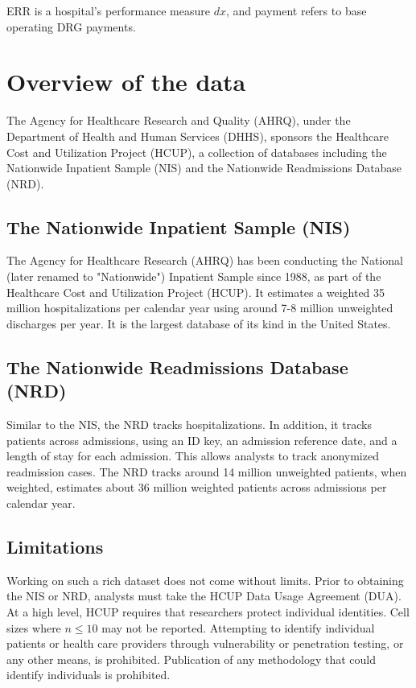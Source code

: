 \documentclass[12pt]{ociamthesis}\usepackage[]{graphicx}\usepackage[]{color}
\begin{document}
ERR is a hospital's performance measure $dx$, and payment refers to base operating DRG payments. \cite{HRRPPaymentAdjustment, Lessa2015}


\section{Overview of the data}

The Agency for Healthcare Research and Quality (AHRQ), under the Department of Health and Human Services (DHHS), sponsors the
Healthcare Cost and Utilization Project (HCUP), a collection of databases including the Nationwide Inpatient Sample (NIS) and
the Nationwide Readmissions Database (NRD). \cite{HCUPOverview}

\subsection{The Nationwide Inpatient Sample (NIS)}

The Agency for Healthcare Research (AHRQ) has been conducting the National (later renamed to "Nationwide") Inpatient
Sample since 1988, as part of the Healthcare Cost and Utilization Project (HCUP). It estimates a weighted 35 million
hospitalizations per calendar year using around 7-8 million unweighted discharges per year. It is the largest database
of its kind in the United States. \cite{NISOverview}

\subsection{The Nationwide Readmissions Database (NRD)}

Similar to the NIS, the NRD tracks hospitalizations. In addition, it tracks patients across admissions, using an ID key,
an admission reference date, and a length of stay for each admission. This allows analysts to track anonymized readmission cases.
The NRD tracks around 14 million unweighted patients, when weighted, estimates about 36 million weighted patients across admissions 
per calendar year. \cite{NRDOverview} 

\subsection{Limitations}

Working on such a rich dataset does not come without limits. Prior to obtaining the NIS or NRD, analysts must take the HCUP
Data Usage Agreement (DUA). At a high level, HCUP requires that researchers protect individual identities. Cell sizes where $n \le 10$ 
may not be reported. Attempting to identify individual patients or health care providers through vulnerability or penetration testing, 
or any other means, is prohibited. Publication of any methodology that could identify individuals is prohibited.
\end{document}
